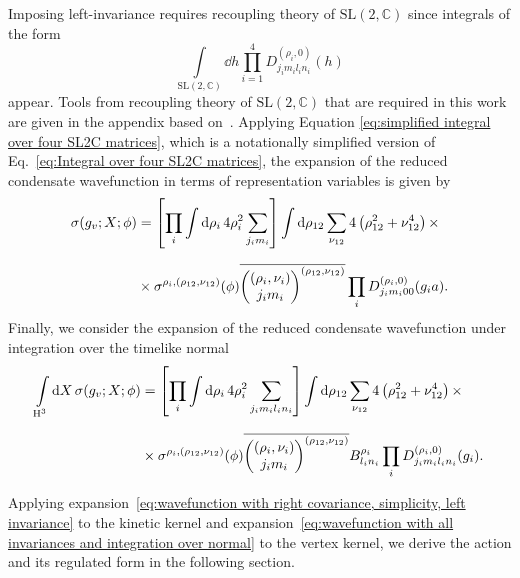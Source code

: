 \documentclass[11pt,a4paper]{article}
\newcommand{\C}{\mathbb C}
\newcommand{\SL}{\text{SL$(2,\C)$}}
\newcommand{\HH}{\text{H}^3}
\begin{document}
Imposing left-invariance requires recoupling theory of $\SL$ since integrals of the form
%
\begin{equation}
\int\limits_{\SL}\dd{h}\prod_{i=1}^4 D^{(\rho_i,0)}_{j_i m_i l_i n_i}(h)
\end{equation}
%
appear. Tools from recoupling theory of $\SL$ that are required in this work are given in the appendix based on~\cite{Speziale:2016axj}. Applying Equation \eqref{eq:simplified integral over four SL2C matrices}, which is a notationally simplified version of Eq.~\eqref{eq:Integral over four SL2C matrices}, the expansion of the reduced condensate wavefunction in terms of representation variables is given by
%
\begin{equation}\label{eq:wavefunction with right covariance, simplicity, left invariance}
\begin{aligned}
\sigma(g_v;X;\phi)
& =
\left[\prod_i \int\dd{\rho_i}4\rho_i^2\sum_{j_i m_i}\right]\int\dd{\rho_{12}}\sum_{\nu_{12}}4\left(\rho_{12}^2+\nu_{12}^4\right)\times\\[7pt]
& \times
\sigma^{\rho_i,(\rho_{12},\nu_{12})}(\phi)\overline{\mqty((\rho_i,\nu_i) \\ j_i m_i)^{(\rho_{12},\nu_{12})}} \prod_{i}D^{(\rho_i,0)}_{j_i m_i 00 }(g_ia).
\end{aligned}
\end{equation}
%
Finally, we consider the expansion of the reduced condensate wavefunction under integration over the timelike normal
%
\begin{equation}\label{eq:wavefunction with all invariances and integration over normal}
\begin{aligned}
\int\limits_{\HH}\dd{X}\sigma(g_v;X;\phi) 
&=
\left[\prod_i \int\dd{\rho_i}4\rho_i^2\sum_{j_i m_i l_i n_i}\right]\int\dd{\rho_{12}}\sum_{\nu_{12}}4\left(\rho_{12}^2+\nu_{12}^4\right)\times\\[7pt]
& \times
\sigma^{\rho_i,(\rho_{12},\nu_{12})}(\phi)\overline{\mqty((\rho_i,\nu_i) \\ j_i m_i)^{(\rho_{12},\nu_{12})}}B^{\rho_i}_{l_i n_i} \prod_{i}D^{(\rho_i,0)}_{j_i m_i l_i n_i }(g_i).
\end{aligned}
\end{equation}

Applying expansion~\eqref{eq:wavefunction with right covariance, simplicity, left invariance} to the kinetic kernel and expansion~\eqref{eq:wavefunction with all invariances and integration over normal} to the vertex kernel, we derive the action and its regulated form in the following section.
\end{document}
